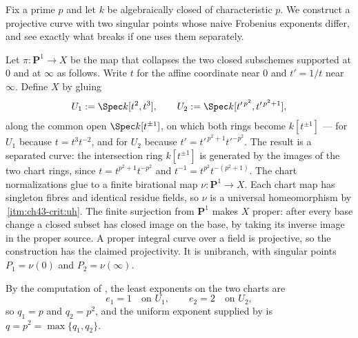 \begin{example}
\label{ex:ch43-two-cusps}
Fix a prime $p$ and let $k$ be algebraically closed of characteristic
$p$.  We construct a projective curve with two singular points whose naive
Frobenius exponents differ, and see exactly what breaks if one uses them
separately.

Let $\pi:\mathbf P^1\to X$ be the map that collapses the two closed
subschemes supported at $0$ and at $\infty$ as follows.  Write
$t$ for the affine coordinate near $0$ and $t'=1/t$ near $\infty$.
Define $X$ by gluing
\[
 U_1:=\Spec k[t^2,t^3],
 \qquad
 U_2:=\Spec k[t'^{\,p^2},t'^{\,p^2+1}],
\]
along the common open $\Spec k[t^{\pm1}]$, on which both rings become
$k[t^{\pm1}]$ --- for $U_1$ because $t=t^3t^{-2}$, and for $U_2$
because $t'=t'^{\,p^2+1}t'^{-p^2}$.  The result is a separated curve: the intersection ring $k[t^{\pm1}]$
is generated by the images of the two chart rings, since
$t=t^{p^2+1}t^{-p^2}$ and $t^{-1}=t^{p^2}t^{-(p^2+1)}$.
The chart normalizations glue to a finite birational map
$\nu:\mathbf P^1\to X$.  Each chart map has singleton fibres and
identical residue fields, so $\nu$ is a universal homeomorphism by
\,\cref{itm:ch43-crit:uh}.  The finite surjection from $\mathbf P^1$ makes $X$ proper:
after every base change a closed subset has closed image on the base,
by taking its inverse image in the proper source.
A proper integral curve over a field is projective, so the construction
has the claimed projectivity.  It is unibranch, with
singular points $P_1=\nu(0)$ and $P_2=\nu(\infty)$.

By the computation of , the least exponents on
the two charts are
\[
 e_1=1
 \quad\text{on }U_1,
 \qquad
 e_2=2
 \quad\text{on }U_2,
\]
so $q_1=p$ and $q_2=p^2$, and the uniform exponent supplied by
 is $q=p^2=\max\{q_1,q_2\}$.


\end{example}
